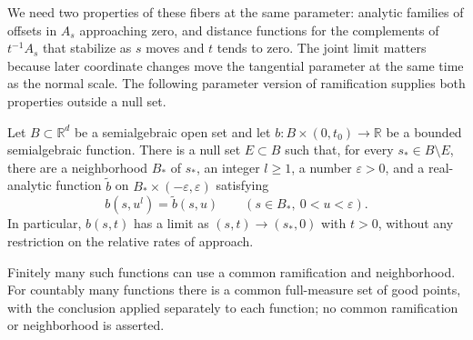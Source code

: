We need two properties of these fibers at the same parameter: analytic families of offsets in $A_s$ approaching zero, and distance functions for the complements of $t^{-1}A_s$ that stabilize as $s$ moves and $t$ tends to zero.  The joint limit matters because later coordinate changes move the tangential parameter at the same time as the normal scale.  The following parameter version of ramification supplies both properties outside a null set.

\begin{lemma}
\label{lem:ramified-parameters}
Let $B\subset\mathbb{R}^d$ be a semialgebraic open set and let $b:B\times(0,t_0)\to\mathbb{R}$ be a bounded semialgebraic function.  There is a null set $E\subset B$ such that, for every $s_*\in B\setminus E$, there are a neighborhood $B_*$ of $s_*$, an integer $l\geq1$, a number $\varepsilon>0$, and a real-analytic function $\widetilde b$ on $B_*\times(-\varepsilon,\varepsilon)$ satisfying
\[
 b(s,u^l)=\widetilde b(s,u)
 \qquad(s\in B_*,\ 0<u<\varepsilon).
\]
In particular, $b(s,t)$ has a limit as $(s,t)\to(s_*,0)$ with $t>0$, without any restriction on the relative rates of approach.

Finitely many such functions can use a common ramification and neighborhood.  For countably many functions there is a common full-measure set of good points, with the conclusion applied separately to each function; no common ramification or neighborhood is asserted.
\end{lemma}

